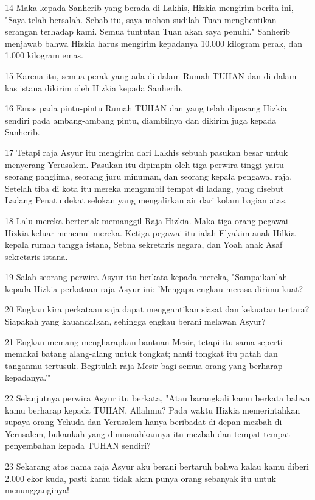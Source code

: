 \par 14 Maka kepada Sanherib yang berada di Lakhis, Hizkia mengirim berita ini, "Saya telah bersalah. Sebab itu, saya mohon sudilah Tuan menghentikan serangan terhadap kami. Semua tuntutan Tuan akan saya penuhi." Sanherib menjawab bahwa Hizkia harus mengirim kepadanya 10.000 kilogram perak, dan 1.000 kilogram emas.
\par 15 Karena itu, semua perak yang ada di dalam Rumah TUHAN dan di dalam kas istana dikirim oleh Hizkia kepada Sanherib.
\par 16 Emas pada pintu-pintu Rumah TUHAN dan yang telah dipasang Hizkia sendiri pada ambang-ambang pintu, diambilnya dan dikirim juga kepada Sanherib.
\par 17 Tetapi raja Asyur itu mengirim dari Lakhis sebuah pasukan besar untuk menyerang Yerusalem. Pasukan itu dipimpin oleh tiga perwira tinggi yaitu seorang panglima, seorang juru minuman, dan seorang kepala pengawal raja. Setelah tiba di kota itu mereka mengambil tempat di ladang, yang disebut Ladang Penatu dekat selokan yang mengalirkan air dari kolam bagian atas.
\par 18 Lalu mereka berteriak memanggil Raja Hizkia. Maka tiga orang pegawai Hizkia keluar menemui mereka. Ketiga pegawai itu ialah Elyakim anak Hilkia kepala rumah tangga istana, Sebna sekretaris negara, dan Yoah anak Asaf sekretaris istana.
\par 19 Salah seorang perwira Asyur itu berkata kepada mereka, "Sampaikanlah kepada Hizkia perkataan raja Asyur ini: 'Mengapa engkau merasa dirimu kuat?
\par 20 Engkau kira perkataan saja dapat menggantikan siasat dan kekuatan tentara? Siapakah yang kauandalkan, sehingga engkau berani melawan Asyur?
\par 21 Engkau memang mengharapkan bantuan Mesir, tetapi itu sama seperti memakai batang alang-alang untuk tongkat; nanti tongkat itu patah dan tanganmu tertusuk. Begitulah raja Mesir bagi semua orang yang berharap kepadanya.'"
\par 22 Selanjutnya perwira Asyur itu berkata, "Atau barangkali kamu berkata bahwa kamu berharap kepada TUHAN, Allahmu? Pada waktu Hizkia memerintahkan supaya orang Yehuda dan Yerusalem hanya beribadat di depan mezbah di Yerusalem, bukankah yang dimusnahkannya itu mezbah dan tempat-tempat penyembahan kepada TUHAN sendiri?
\par 23 Sekarang atas nama raja Asyur aku berani bertaruh bahwa kalau kamu diberi 2.000 ekor kuda, pasti kamu tidak akan punya orang sebanyak itu untuk menungganginya!
